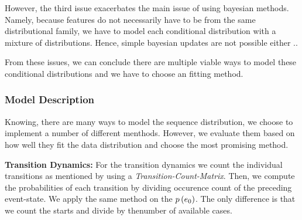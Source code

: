 \documentclass[./../../paper.tex]{subfiles}
\begin{document}
However, the third issue exacerbates the main issue of using bayesian methods. Namely, because features do not necessarily have to be from the same distributional family, we have to model each conditional distribution with a mixture of distributions. Hence, simple bayesian updates are not possible either ..

From these issues, we can conclude there are multiple viable ways to model these conditional distributions and we have to choose an fitting method\footnotemark. 

\subsubsection{Model Description}
Knowing, there are many ways to model the sequence distribution, we choose to implement a number of different menthods. However, we evaluate them based on how well they fit the data distribution and choose the most promising method.

\noindent\textbf{Transition Dynamics:} For the transition dynamics we count the individual transitions as mentioned by using a \emph{Transition-Count-Matrix}. Then, we compute the probabilities of each transition by dividing occurence count of the preceding event-state. We apply the same method on the $p\left(e_0\right)$. The only difference is that we count the starts and divide by thenumber of available cases.
\end{document}
